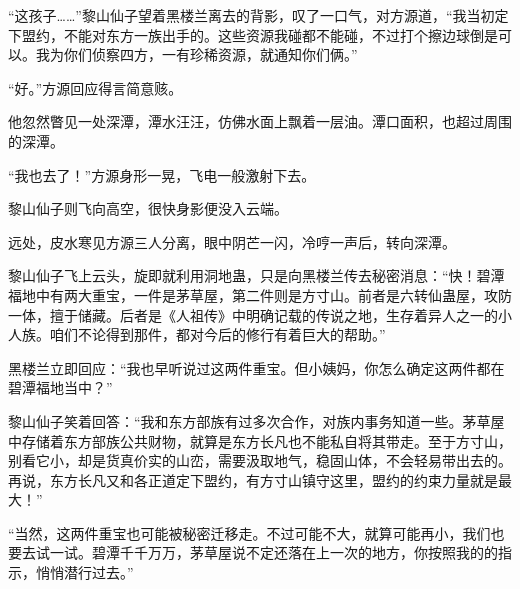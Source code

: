 \begin{this_body}
“这孩子……”黎山仙子望着黑楼兰离去的背影，叹了一口气，对方源道，“我当初定下盟约，不能对东方一族出手的。这些资源我碰都不能碰，不过打个擦边球倒是可以。我为你们侦察四方，一有珍稀资源，就通知你们俩。”

“好。”方源回应得言简意赅。

他忽然瞥见一处深潭，潭水汪汪，仿佛水面上飘着一层油。潭口面积，也超过周围的深潭。

“我也去了！”方源身形一晃，飞电一般激射下去。

黎山仙子则飞向高空，很快身影便没入云端。

远处，皮水寒见方源三人分离，眼中阴芒一闪，冷哼一声后，转向深潭。

黎山仙子飞上云头，旋即就利用洞地蛊，只是向黑楼兰传去秘密消息：“快！碧潭福地中有两大重宝，一件是茅草屋，第二件则是方寸山。前者是六转仙蛊屋，攻防一体，擅于储藏。后者是《人祖传》中明确记载的传说之地，生存着异人之一的小人族。咱们不论得到那件，都对今后的修行有着巨大的帮助。”

黑楼兰立即回应：“我也早听说过这两件重宝。但小姨妈，你怎么确定这两件都在碧潭福地当中？”

黎山仙子笑着回答：“我和东方部族有过多次合作，对族内事务知道一些。茅草屋中存储着东方部族公共财物，就算是东方长凡也不能私自将其带走。至于方寸山，别看它小，却是货真价实的山峦，需要汲取地气，稳固山体，不会轻易带出去的。再说，东方长凡又和各正道定下盟约，有方寸山镇守这里，盟约的约束力量就是最大！”

“当然，这两件重宝也可能被秘密迁移走。不过可能不大，就算可能再小，我们也要去试一试。碧潭千千万万，茅草屋说不定还落在上一次的地方，你按照我的的指示，悄悄潜行过去。”

\end{this_body}

